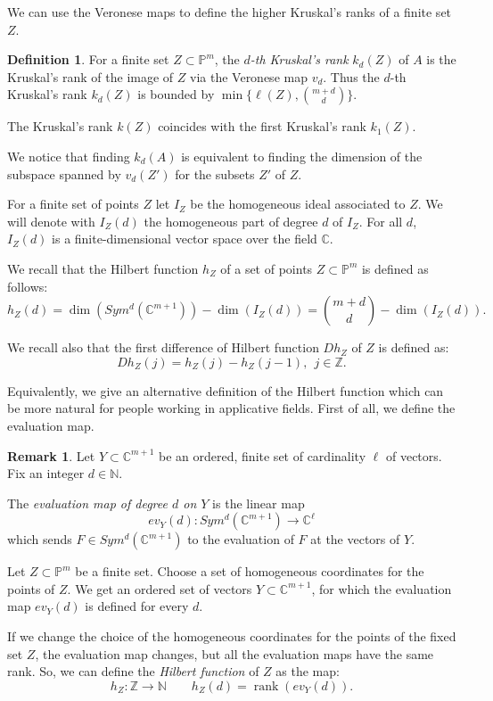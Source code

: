\documentclass[a4paper,10pt,oneside]{article}
\theoremstyle{casep}
\newcommand{\C}{\mathbb{C}}
\newcommand{\Z}{\mathbb{Z}}
\newcommand{\Pj}{\mathbb{P}}
\newcommand{\N}{\mathbb{N}}
\theoremstyle{definition}
\newtheorem{definition}[theorem]{Definition}
\newtheorem{remark}[theorem]{Remark}
\newcommand{\rank}{\operatorname{rank}}
\begin{document}
We can use the Veronese maps to define the higher Kruskal's ranks of a finite set $Z$.

\begin{definition}\label{remark:span}
For a finite set $Z \subset \Pj^m$, the \emph{$d$-th Kruskal's rank} $k_d(Z)$ of $A$ is the Kruskal's rank of the image of $Z$ via the Veronese map $v_d$.
Thus the $d$-th Kruskal's rank $k_d(Z)$ is bounded by $\min\{\ell(Z), \binom{m+d}d\}$.

The Kruskal's rank $k(Z)$ coincides with the first Kruskal's rank $k_1(Z)$.

We notice that finding $k_d(A)$ is equivalent to finding the dimension of the subspace spanned by $v_d(Z')$ for the subsets $Z'$ of $Z$.
\end{definition}


\vspace{5mm}

For a finite set of points $Z$ let $I_Z$ be the homogeneous ideal associated to $Z$. We will denote with $I_Z(d)$ the homogeneous part of degree $d$ of $I_Z$. 
For all $d$, $I_Z(d)$ is a finite-dimensional vector space over the field $\C$.


We recall that the Hilbert function $h_Z$ of a set of points $Z \subset \mathbb{P}^{m}$ is defined as follows:
	$$h_Z(d)= \dim(Sym^d(\mathbb{C}^{m+1}))- \dim (I_Z(d))= \binom{m+d}{d} - \dim(I_Z(d)).$$ 


We recall also that the first difference of Hilbert function $Dh_Z$ of $Z$ is defined as:$$Dh_Z(j)=h_Z(j)-h_Z(j-1), \ \ j\in\mathbb{Z}.$$


Equivalently, we give an alternative definition of the Hilbert function which can be more natural for people working in applicative fields. First of all, we define the evaluation map.

\begin{remark}
Let $Y\subset \C^{m+1} $ be an ordered, finite set of cardinality $\ell $ of vectors. Fix an integer $ d \in \N $. 

The \emph{evaluation map of degree $d$ on $Y$} is the linear map
$$ ev_{Y}(d): Sym^d(\C^{m+1}) \to \C^\ell $$ 
which sends $ F \in Sym^d(\C^{m+1}) $ to the evaluation of $ F$ at the vectors of $Y$. 

Let $Z \subset \Pj^m $ be a finite set. Choose a set of homogeneous coordinates for the points of $Z$.
We get an ordered set of vectors $Y\subset \C^{m+1} $, for which the evaluation map $ev_{Y}(d)$ is defined for every $d$.

If we change the choice of the homogeneous coordinates for the points of the fixed set $Z$, the evaluation map
changes, but all the evaluation maps have the same rank. 
So, we can define the \emph{Hilbert function} of $Z$ as the map:
$$ h_Z : \Z \to \N \qquad h_Z(d) = \rank(ev_{Y}(d)) .$$ 
\end{remark}
\end{document}
